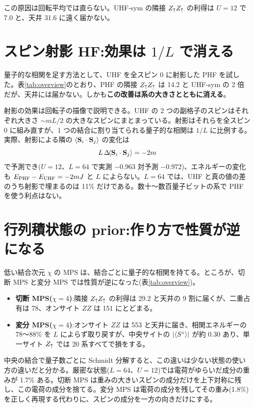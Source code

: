 この原因は回転平均では直らない。UHF-sym の隣接 $Z_\uparrow Z_\uparrow$ の利得は $U=12$ で 7.0 と、天井 31.6 に遠く届かない。

\section{スピン射影 HF:効果は $1/L$ で消える}
\label{sec:phf}

量子的な相関を足す方法として、UHF を全スピン 0 に射影した PHF を試した。表\ref{tab:overview}のとおり、PHF の隣接 $Z_\uparrow Z_\uparrow$ は 14.2 と UHF-sym の 2 倍だが、天井には届かない。しかも\textbf{この改善は系の大きさとともに消える}。

射影の効果は回転子の描像で説明できる。UHF の 2 つの副格子のスピンはそれぞれ大きさ $\sim mL/2$ の大きなスピンにまとまっている。射影はそれらを全スピン 0 に組み直すが、1 つの結合に割り当てられる量子的な相関は $1/L$ に比例する。実際、射影による隣の $\langle \mathbf S_i\cdot\mathbf S_j\rangle$ の変化は
\begin{equation}
  L\,\Delta\!\langle \mathbf S_i\cdot\mathbf S_j\rangle=-2m
\end{equation}
で予測でき($U=12$、$L=64$ で実測 $-0.963$ 対予測 $-0.972$)、エネルギーの変化も $E_{\rm PHF}-E_{\rm UHF}=-2mJ$ と $L$ によらない。$L=64$ では、UHF と真の値の差のうち射影で埋まるのは 11\% だけである。数十〜数百量子ビットの系で PHF を使う利点はない。

\section{行列積状態の prior:作り方で性質が逆になる}
\label{sec:mps}

低い結合次元 $\chi$ の MPS は、結合ごとに量子的な相関を持てる。ところが、切断 MPS と変分 MPS では性質が逆になった(表\ref{tab:overview})。
\begin{itemize}
  \item \textbf{切断 MPS($\chi=4$)}:隣接 $Z_\uparrow Z_\uparrow$ の利得は 29.2 と天井の 9 割に届くが、二重占有は 78、オンサイト $ZZ$ は 151 にとどまる。
  \item \textbf{変分 MPS($\chi=4$)}:オンサイト $ZZ$ は 553 と天井に届き、相関エネルギーの 78〜88\% を $L$ によらず取り戻すが、中央サイトの $\lvert\langle S^z\rangle\rvert$ が約 0.30 あり、単一サイト $Z_\uparrow$ では 20 系すべてで損をする。
\end{itemize}
中央の結合で量子数ごとに Schmidt 分解すると、この違いは少ない状態の使い方の違いだと分かる。厳密な状態($L=64$、$U=12$)では電荷がゆらいだ成分の重みが 1.7\% ある。切断 MPS は重みの大きいスピンの成分だけを上下対称に残し、この電荷の成分を捨てる。変分 MPS は電荷の成分を残してその重み(1.8\%)を正しく再現する代わりに、スピンの成分を一方の向きだけにする。

